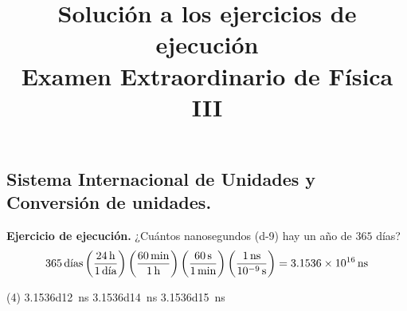 \documentclass[12pt, letter]{exam}
\date{}
\title{Solución a los ejercicios de ejecución \\ Examen Extraordinario de Física III}
\begin{document}
\maketitle

\setcounter{page}{2}

\begin{questions}
    \section{Sistema Internacional de Unidades y Conversión de unidades.}
    \setcounter{question}{1} \question \textbf{Ejercicio de ejecución.} ¿Cuántos nanosegundos (\num{d-9}) hay un año de $365$ días?
    \begin{align*}
        365 \, \text{días} \left( \dfrac{\SI{24}{\hour}}{1 \, \text{día}} \right) \left( \dfrac{\SI{60}{\minute}}{\SI{1}{\hour}} \right) \left( \dfrac{\SI{60}{\second}}{\SI{1}{\minute}} \right) \left( \dfrac{\SI{1}{\nano\second}}{\SI{d-9}{\second}} \right) = \SI{3.1536d16}{\nano\second}
    \end{align*}
    \begin{tasks}(4)
        \task \SI{3.1536d12}{\nano\second}
        \task \SI{3.1536d14}{\nano\second}
        \task \SI{3.1536d15}{\nano\second}
        \task {}
    \end{tasks}
    

\end{questions}
\end{document}
